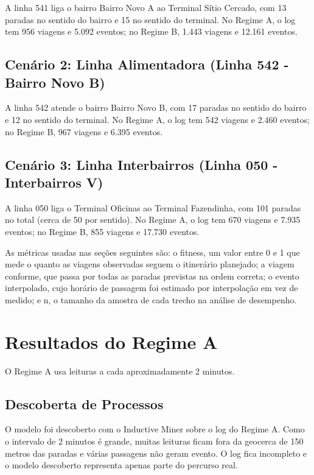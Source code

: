 A linha 541 liga o bairro Bairro Novo A ao Terminal Sítio Cercado, com 13 paradas no sentido do bairro e 15 no sentido do terminal. No Regime A, o log tem 956 viagens e 5.092 eventos; no Regime B, 1.443 viagens e 12.161 eventos.

\subsection{Cenário 2: Linha Alimentadora (Linha 542 - Bairro Novo B)}\label{subsec:cenario542}

A linha 542 atende o bairro Bairro Novo B, com 17 paradas no sentido do bairro e 12 no sentido do terminal. No Regime A, o log tem 542 viagens e 2.460 eventos; no Regime B, 967 viagens e 6.395 eventos.

\subsection{Cenário 3: Linha Interbairros (Linha 050 - Interbairros V)}\label{subsec:cenario050}

A linha 050 liga o Terminal Oficinas ao Terminal Fazendinha, com 101 paradas no total (cerca de 50 por sentido). No Regime A, o log tem 670 viagens e 7.935 eventos; no Regime B, 855 viagens e 17.730 eventos.

As métricas usadas nas seções seguintes são: o fitness, um valor entre 0 e 1 que mede o quanto as viagens observadas seguem o itinerário planejado; a viagem conforme, que passa por todas as paradas previstas na ordem correta; o evento interpolado, cujo horário de passagem foi estimado por interpolação em vez de medido; e n, o tamanho da amostra de cada trecho na análise de desempenho.

\section{Resultados do Regime A}\label{sec:regimeA}

O Regime A usa leituras a cada aproximadamente 2 minutos.

\subsection{Descoberta de Processos}\label{subsec:regimeA_descoberta}

O modelo foi descoberto com o Inductive Miner sobre o log do Regime A. Como o intervalo de 2 minutos é grande, muitas leituras ficam fora da geocerca de 150 metros das paradas e várias passagens não geram evento. O log fica incompleto e o modelo descoberto representa apenas parte do percurso real.

